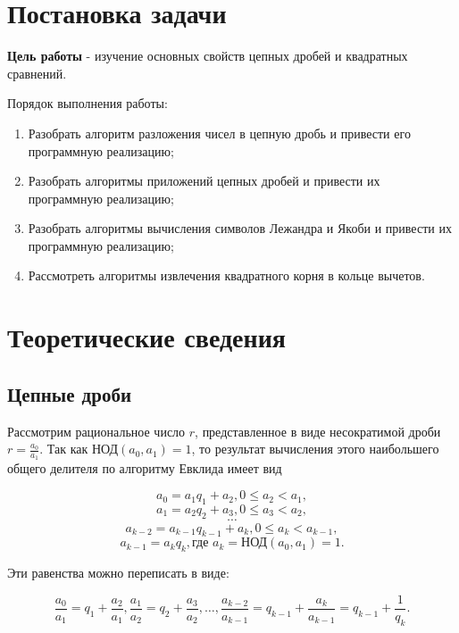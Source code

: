 \documentclass[bachelor, och, labwork]{shiza}
\begin{document}

\section{Постановка задачи}

    \textbf{Цель работы} - изучение основных свойств цепных дробей и квадратных
    сравнений. 

    Порядок выполнения работы:
    \begin{enumerate}
        \item Разобрать алгоритм разложения чисел в цепную дробь и привести его
        программную реализацию;
        \item Разобрать алгоритмы приложений цепных дробей и привести их
        программную реализацию;
        \item Разобрать алгоритмы вычисления символов Лежандра и Якоби и
        привести их программную реализацию;
        \item Рассмотреть алгоритмы извлечения квадратного корня в кольце
        вычетов.
    \end{enumerate}

\section{Теоретические сведения}

    \subsection{Цепные дроби}

        Рассмотрим рациональное число $r$, представленное в виде несократимой
        дроби $r = \frac{a_0}{a_1}$. Так как НОД$(a_0, a_1) = 1$, то результат
        вычисления этого наибольшего общего делителя по алгоритму Евклида имеет
        вид

        $$a_0 = a_1 q_1 + a_2, 0 \leq a_2 < a_1,$$
        $$a_1 = a_2 q_2 + a_3, 0 \leq a_3 < a_2,$$
        $$\cdots$$
        $$a_{k-2} = a_{k-1} q_{k-1} + a_{k}, 0 \leq a_{k} < a_{k-1},$$
        $$a_{k-1} = a_k q_k, \text{где } a_k = \text{НОД} (a_0, a_1) = 1.$$

        Эти равенства можно переписать в виде:

        $$\frac{a_0}{a_1} = q_1 + \frac{a_2}{a_1}, \frac{a_1}{a_2} = q_2 +
        \frac{a_3}{a_2}, \dots, \frac{a_{k-2}}{a_{k-1}} = q_{k-1} +
        \frac{a_k}{a_{k-1}} = q_{k-1} + \frac{1}{q_k}.$$
\end{document}
